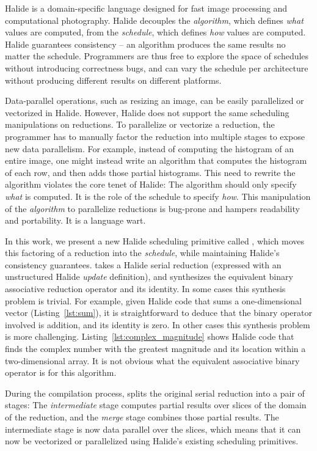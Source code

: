 Halide \cite{Ragan-Kelley:2013:HLC:2491956.2462176} is a domain-specific language designed for fast image processing and computational photography. Halide decouples the \emph{algorithm}, which defines \emph{what} values are computed, from the \emph{schedule}, which defines \emph{how} values are computed. Halide guarantees consistency -- an algorithm produces the same results no matter the schedule. Programmers are thus free to explore the space of schedules without introducing correctness bugs, and can vary the schedule per architecture without producing different results on different platforms.

Data-parallel operations, such as resizing an image, can be easily parallelized or vectorized in Halide. However, Halide does not support the same scheduling manipulations on reductions. To parallelize or vectorize a reduction, the programmer has to manually factor the reduction into multiple stages to expose new data parallelism. For example, instead of computing the histogram of an entire image, one might instead write an algorithm that computes the histogram of each row, and then adds those partial histograms. This need to rewrite the algorithm violates the core tenet of Halide: The algorithm should only specify \emph{what} is computed. It is the role of the schedule to specify \emph{how}. This manipulation of the \emph{algorithm} to parallelize reductions is bug-prone and hampers readability and portability. It is a language wart.

In this work, we present a new Halide scheduling primitive called , which moves this factoring of a reduction into the \emph{schedule}, while maintaining Halide's consistency guarantees.  takes a Halide serial reduction (expressed with an unstructured Halide \emph{update} definition), and synthesizes the equivalent binary associative reduction operator and its identity. In some cases this synthesis problem is trivial. For example, given Halide code that sums a one-dimensional vector (Listing~\ref{lst:sum}), it is straightforward to deduce that the binary operator involved is addition, and its identity is zero. In other cases this synthesis problem is more challenging. Listing~\ref{lst:complex_magnitude} shows Halide code that finds the complex number with the greatest magnitude and its location within a two-dimensional array. It is not obvious what the equivalent associative binary operator is for this algorithm.


During the compilation process,  splits the original serial reduction into a pair of stages: The \emph{intermediate} stage computes partial results over slices of the domain of the reduction, and the \emph{merge} stage combines those partial results. The intermediate stage is now data parallel over the slices, which means that it can now be vectorized or parallelized using Halide's existing scheduling primitives.

